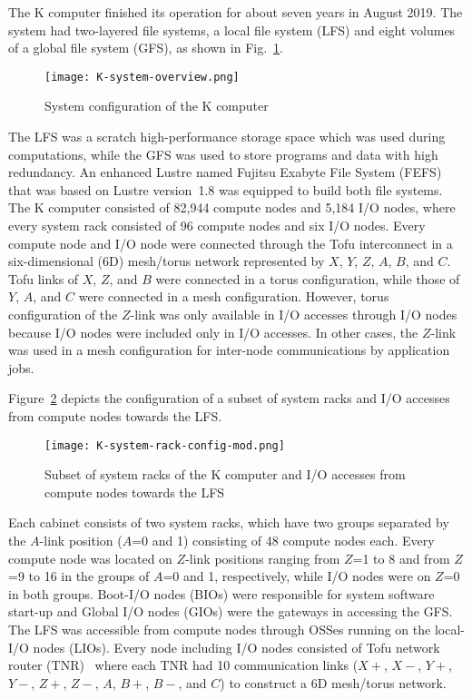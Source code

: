 \documentclass{jhps}
\begin{document}
The K computer finished its operation for about seven years in August 2019.
The system had two-layered file systems, a local file system (LFS)
and eight volumes of a global file system (GFS), as shown in Fig.~\ref{fig:K_OVERVIEW}.
%
\begin{figure}[tb]
\centering
\texttt{[image: K-system-overview.png]}
\caption{System configuration of the K computer}
\label{fig:K_OVERVIEW}
\end{figure}
%
The LFS was a scratch high-performance storage space which was used during computations,
while the GFS was used to store programs and data with high redundancy.
An enhanced Lustre named Fujitsu Exabyte File System (FEFS)~\cite{fefs:fujitsu-tech-si}
that was based on Lustre version~1.8 was equipped to build both file systems.
The K computer consisted of 82,944 compute nodes and 5,184 I/O nodes,
where every system rack consisted of 96 compute nodes and six I/O nodes.
Every compute node and I/O node were connected through the Tofu interconnect
in a six-dimensional (6D) mesh/torus network represented by $X$, $Y$, $Z$, $A$, $B$, and $C$.
Tofu links of $X$, $Z$, and $B$ were connected in a torus configuration,
while those of $Y$, $A$, and $C$ were connected in a mesh configuration.
However, torus configuration of the $Z$-link was only available
in I/O accesses through I/O nodes because I/O nodes were included
only in I/O accesses.
In other cases, the $Z$-link was used in a mesh configuration for
inter-node communications by application jobs.

Figure~\ref{fig:SUBSET_SYSRACK_K} depicts the configuration of a subset of system racks
and I/O accesses from compute nodes towards the LFS.
%
\begin{figure}[tb]
\centering
\texttt{[image: K-system-rack-config-mod.png]}
\caption{Subset of system racks of the K computer and I/O accesses from compute nodes
towards the LFS}
\label{fig:SUBSET_SYSRACK_K}
\end{figure}
%
Each cabinet consists of two system racks, which have two groups separated
by the $A$-link position ($A$=0 and 1) consisting of 48 compute nodes each.
Every compute node was located on $Z$-link positions ranging from $Z$=1 to 8
and from $Z$=9 to 16 in the groups of $A$=0 and 1, respectively,
while I/O nodes were on $Z$=0 in both groups.
Boot-I/O nodes (BIOs) were responsible for system software start-up and
Global I/O nodes (GIOs) were the gateways in accessing the GFS.
The LFS was accessible from compute nodes through OSSes running
on the local-I/O nodes (LIOs).
Every node including I/O nodes consisted of Tofu network router (TNR)~\cite{tofu:micro2012}
where each TNR had 10 communication links
($X+$, $X-$, $Y+$, $Y-$, $Z+$, $Z-$, $A$, $B+$, $B-$, and $C$)
to construct a 6D mesh/torus network.
\end{document}
